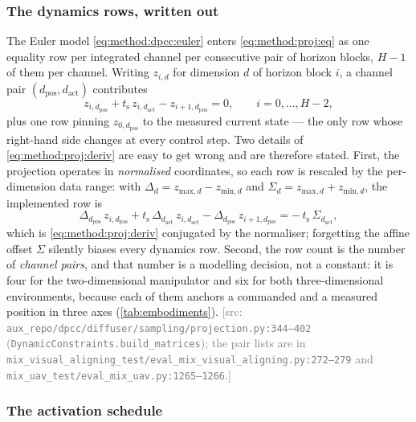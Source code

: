 \documentclass[headsepline,footsepline,footinclude=false,oneside,fontsize=11pt,paper=a4,listof=totoc,bibliography=totoc]{scrbook}
\theoremstyle{definition}
\theoremstyle{plain}
\theoremstyle{remark}
\newcommand{\sidx}[1]{_{\textrm{#1}}}
\newif\ifsubmission
\newcommand{\srcnote}[1]{\ifsubmission\else\textcolor{gray}{\footnotesize\textsf{[src: #1]}}\fi}
\begin{document}
\subsubsection*{The dynamics rows, written out}

The Euler model \eqref{eq:method:dpcc:euler} enters \eqref{eq:method:proj:eq} as one equality row per
integrated channel per consecutive pair of horizon blocks, $H-1$ of them per channel. Writing $z_{i,d}$ for dimension $d$ of horizon block $i$, a
channel pair $(d\sidx{pos},d\sidx{act})$ contributes
\begin{equation}\label{eq:method:proj:deriv}
  z_{i,d\sidx{pos}} + t\sidx{s}\,z_{i,d\sidx{act}} - z_{i+1,d\sidx{pos}} = 0,
  \qquad i = 0,\dots,H-2,
\end{equation}
plus one row pinning $z_{0,d\sidx{pos}}$ to the measured current state --- the only row whose
right-hand side changes at every control step. Two details of \eqref{eq:method:proj:deriv} are easy
to get wrong and are therefore stated. First, the projection operates in \emph{normalised}
coordinates, so each row is rescaled by the per-dimension data range: with
$\Delta_{d} = z_{\textrm{max},d} - z_{\textrm{min},d}$ and
$\Sigma_{d} = z_{\textrm{max},d} + z_{\textrm{min},d}$, the implemented row is
\begin{equation}\label{eq:method:proj:derivnorm}
  \Delta_{d\sidx{pos}}\,z_{i,d\sidx{pos}}
  + t\sidx{s}\,\Delta_{d\sidx{act}}\,z_{i,d\sidx{act}}
  - \Delta_{d\sidx{pos}}\,z_{i+1,d\sidx{pos}}
  = -\,t\sidx{s}\,\Sigma_{d\sidx{act}} ,
\end{equation}
which is \eqref{eq:method:proj:deriv} conjugated by the normaliser; forgetting the affine offset
$\Sigma$ silently biases every dynamics row. Second, the row count is the number of
\emph{channel pairs}, and that number is a modelling decision, not a constant: it is four for the
two-dimensional manipulator and six for both three-dimensional environments, because each of them
anchors a commanded and a measured position in three axes
(\autoref{tab:embodiments}).
\srcnote{\texttt{aux\_repo/dpcc/diffuser/sampling/projection.py:344--402}
(\texttt{DynamicConstraints.build\_matrices}); the pair lists are in
\texttt{mix\_visual\_aligning\_test/eval\_mix\_visual\_aligning.py:272--279} and
\texttt{mix\_uav\_test/eval\_mix\_uav.py:1265--1266}.}

\subsubsection*{The activation schedule}
\end{document}

